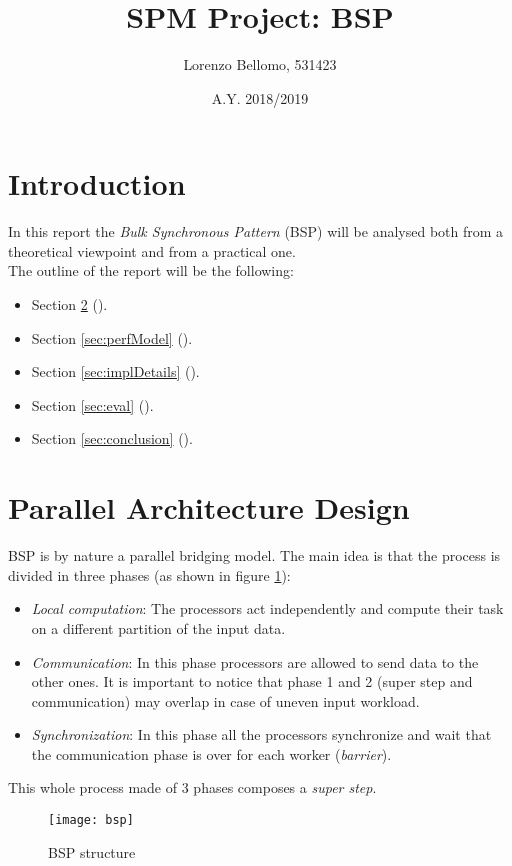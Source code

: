 \documentclass[]{article}
\title{SPM Project: BSP}
\author{Lorenzo Bellomo, 531423}
\date{A.Y. 2018/2019}
\begin{document}
\maketitle

\section{Introduction}

In this report the \emph{Bulk Synchronous Pattern} (BSP) will be analysed both from a theoretical viewpoint and from a practical one. \\
The outline of the report will be the following:
\begin{itemize}
	\item Section \ref{sec:parDesign} ().
	\item Section \ref{sec:perfModel} ().
	\item Section \ref{sec:implDetails} ().
	\item Section \ref{sec:eval} ().
	\item Section \ref{sec:conclusion} ().
\end{itemize}

\section{Parallel Architecture Design}
\label{sec:parDesign}

BSP is by nature a parallel bridging model. The main idea is that the process is divided in three phases (as shown in figure \ref{fig:BSP}):
\begin{itemize}
	\item \emph{Local computation}: The processors act independently and compute their task on a different partition of the input data.
	\item \emph{Communication}: In this phase processors are allowed to send data to the other ones. It is important to notice that phase 1 and 2 (super step and communication) may overlap in case of uneven input workload.
	\item \emph{Synchronization}: In this phase all the processors synchronize and wait that the communication phase is over for each worker (\emph{barrier}).
\end{itemize}
This whole process made of 3 phases composes a \emph{super step}.
\begin{figure}[H]
	\centering
	\texttt{[image: bsp]}
	\caption{BSP structure}
	\label{fig:BSP}
\end{figure}
\end{document}
